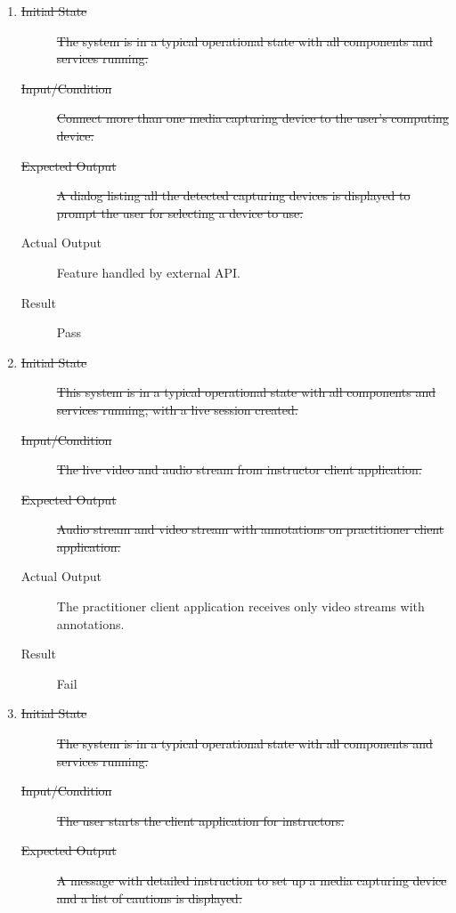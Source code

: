 \documentclass[12pt, titlepage]{article}
\begin{document}
\begin{enumerate}[NFR-T1]
  \item \label{NFRT13}
    \begin{description}
    \item[\sout{Initial State}]\sout{ The system is in a typical operational state with all
      components and services running.
    }\item[\sout{Input/Condition}]\sout{ Connect more than one media capturing device to the
      user’s computing device.
    }\item[\sout{Expected Output}]\sout{ A dialog listing all the detected capturing devices is
      displayed to prompt the user for selecting a device to use.
    }\item[Actual Output] Feature handled by external API.
    \item[Result] Pass
    \end{description}
  \item \label{NFRT14}
    \begin{description}
    \item[\sout{Initial State}]\sout{ This system is in a typical operational state with all
      components and services running, with a live session created.
    }\item[\sout{Input/Condition}]\sout{ The live video and audio stream from instructor client
      application.
    }\item[\sout{Expected Output}]\sout{ Audio stream and video stream with annotations on
      practitioner client application.
    }\item[Actual Output] The practitioner client application receives only video
      streams with annotations.
    \item[Result] Fail
    \end{description}
  \item \label{NFRT15}
    \begin{description}
    \item[\sout{Initial State}]\sout{ The system is in a typical operational state with all
      components and services running.
    }\item[\sout{Input/Condition}]\sout{ The user starts the client application for instructors.
    }\item[\sout{Expected Output}]\sout{ A message with detailed instruction to set up a media
      capturing device and a list of cautions is displayed.
}
\end{description}
\end{enumerate}
\end{document}
